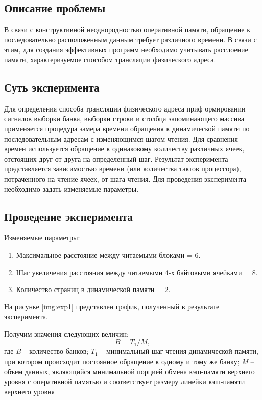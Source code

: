 \subsection{Описание проблемы}
В связи с конструктивной неоднородностью оперативной памяти, обращение к
последовательно расположенным данным требует различного времени. В связи с
этим, для создания эффективных программ необходимо учитывать расслоение памяти,
характеризуемое способом трансляции физического адреса. 

\subsection{Суть эксперимента}  
Для определения способа трансляции физического адреса приф ормировании сигналов
выборки банка, выборки строки и столбца запоминающего массива применяется
процедура замера времени обращения к динамической памяти по последовательным
адресам с изменяющимся шагом чтения. Для сравнения времен используется
обращение к одинаковому количеству различных ячеек, отстоящих друг от друга на
определенный шаг. Результат эксперимента представляется зависимостью времени
(или количества тактов процессора), потраченного на чтение ячеек, от шага
чтения. Для проведения эксперимента необходимо задать изменяемые параметры.

\subsection{Проведение эксперимента}

Изменяемые параметры:
\begin{enumerate}
	\item Максимальное расстояние между читаемыми блоками = 6.
	\item Шаг увеличения расстояния между читаемыми 4-х байтовыми ячейками = 8.
	\item Количество страниц в динамической памяти = 2.
\end{enumerate}

На рисунке \ref{img:exp1} представлен график, полученный в результате
эксперимента.


Получим значения следующих величин:
\begin{equation}
	B = T_1 / M,
\end{equation}
где \textit{B} -- количество банков; $T_1$ -- минимальный шаг чтения
динамической памяти, при котором происходит постоянное обращение к одному и
тому же банку; \textit{M} -- объем данных, являющийся минимальной порцией
обмена кэш-памяти верхнего уровня с оперативной памятью и соответствует размеру
линейки кэш-памяти верхнего уровня

